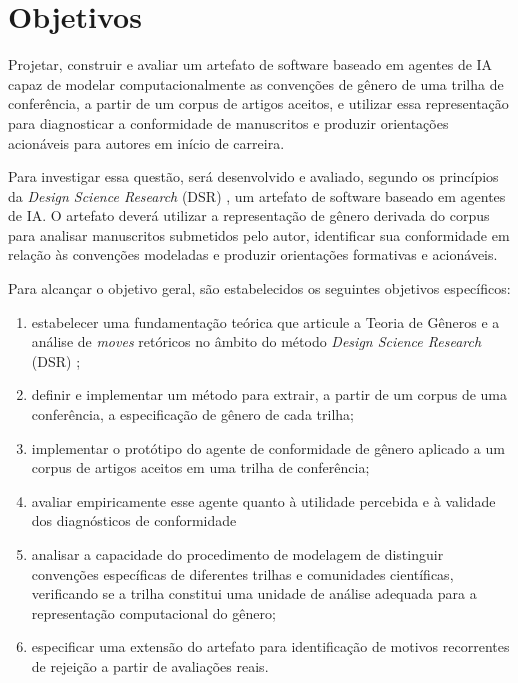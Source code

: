 \section{Objetivos}

Projetar, construir e avaliar um artefato de software baseado em agentes de IA capaz de modelar computacionalmente as convenções de gênero de uma trilha de conferência, a partir de um corpus de artigos aceitos, e utilizar essa representação para diagnosticar a conformidade de manuscritos e produzir orientações acionáveis para autores em início de carreira.

Para investigar essa questão, será desenvolvido e avaliado, segundo os princípios da \textit{Design Science Research} (DSR) \cite{Hevner2004}, um artefato de software baseado em agentes de IA. O artefato deverá utilizar a representação de gênero derivada do corpus para analisar manuscritos submetidos pelo autor, identificar sua conformidade em relação às convenções modeladas e produzir orientações formativas e acionáveis.

Para alcançar o objetivo geral, são estabelecidos os seguintes objetivos específicos:

\begin{enumerate}
    \item estabelecer uma fundamentação teórica que articule a Teoria de Gêneros \cite{GenresOrgComm} e a análise de \textit{moves} retóricos \cite{GenreAnalysis} no âmbito do método \textit{Design Science Research} (DSR) \cite{Hevner2004};

    \item definir e implementar um método para extrair, a partir de um corpus de uma conferência, a especificação de gênero de cada trilha;

    \item implementar o protótipo do agente de conformidade de gênero aplicado a um corpus de artigos aceitos em uma trilha de conferência;

    \item avaliar empiricamente esse agente quanto à utilidade percebida e à validade dos diagnósticos de conformidade

    \item analisar a capacidade do procedimento de modelagem de distinguir convenções específicas de diferentes trilhas e comunidades científicas, verificando se a trilha constitui uma unidade de análise adequada para a representação computacional do gênero;

    \item especificar uma extensão do artefato para identificação de motivos recorrentes de rejeição a partir de avaliações reais.
\end{enumerate}

